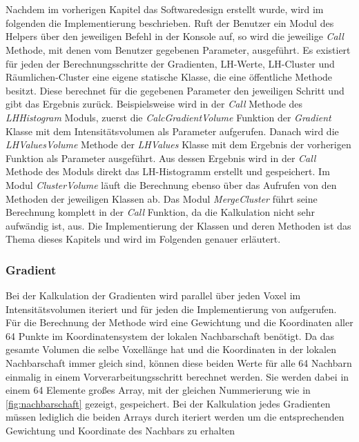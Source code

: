 \chapter{}
\label{sec:implementation}




Nachdem im vorherigen Kapitel das Softwaredesign erstellt wurde, wird im folgenden die Implementierung beschrieben.
\newline
Ruft der Benutzer ein Modul des Helpers über den jeweiligen Befehl in der Konsole auf, so wird die jeweilige \textit{Call} Methode, mit denen vom Benutzer gegebenen Parameter, ausgeführt.
\newline
Es existiert für jeden der Berechnungsschritte der Gradienten, LH-Werte, LH-Cluster und Räumlichen-Cluster eine eigene statische Klasse, die eine öffentliche Methode besitzt. Diese berechnet für die gegebenen Parameter den jeweiligen Schritt und gibt das Ergebnis zurück. 
\newline
Beispielsweise wird in der \textit{Call} Methode des \textit{LHHistogram} Moduls, zuerst die \textit{CalcGradientVolume} Funktion der \textit{Gradient} Klasse mit dem Intensitätsvolumen als Parameter aufgerufen. Danach wird die \textit{LHValuesVolume} Methode der \textit{LHValues} Klasse mit dem Ergebnis der vorherigen Funktion als Parameter ausgeführt. Aus dessen Ergebnis wird in der \textit{Call} Methode des Moduls direkt das LH-Histogramm erstellt und gespeichert.
\newline
Im Modul \textit{ClusterVolume} läuft die Berechnung ebenso über das Aufrufen von den Methoden der jeweiligen Klassen ab.
\newline
Das Modul \textit{MergeCluster} führt seine Berechnung komplett in der \textit{Call} Funktion, da die Kalkulation nicht sehr aufwändig ist, aus.
\newline
Die Implementierung der Klassen und deren Methoden ist das Thema dieses Kapitels und wird im Folgenden genauer erläutert.



\subsection{Gradient}

Bei der  Kalkulation der Gradienten wird parallel über jeden Voxel im Intensitätsvolumen iteriert und für jeden die Implementierung von \cite{hong2003method} aufgerufen.
\newline
Für die Berechnung der Methode wird eine Gewichtung und die Koordinaten aller 64 Punkte im Koordinatensystem der lokalen Nachbarschaft benötigt. Da das gesamte Volumen die selbe Voxellänge hat und die Koordinaten in der lokalen Nachbarschaft immer gleich sind, können diese beiden Werte für alle 64 Nachbarn einmalig in einem Vorverarbeitungsschritt berechnet werden. Sie werden dabei in einem 64 Elemente großes Array, mit der gleichen Nummerierung wie in \autoref{fig:nachbarschaft} gezeigt, gespeichert. Bei der Kalkulation jedes Gradienten müssen lediglich die beiden Arrays durch iteriert werden um die entsprechenden Gewichtung und Koordinate  des Nachbars zu erhalten

